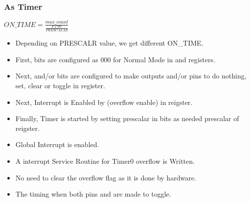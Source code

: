 \subsubsection{As Timer}
\begin{center}
    $ON\_TIME = \frac{max\_count}{\frac{F\_CPU}{PRESCALAR}}$
\end{center}
\begin{itemize}
    \item Depending on PRESCALR value, we get different ON\_TIME.
    \item First,  bits are configured as 000 for Normal Mode in  and  registers.
    \item Next,  and/or  bits are configured to make outputs  and/or  pins to do nothing, set, clear or toggle in  register.
    \item Next, Interrupt is Enabled by  (overflow enable) in  reigster.
    \item Finally, Timer is started by setting prescalar in  bits as needed prescalar of  reigster.
    \item Global Interrupt is enabled.
    \item A interrupt Service Routine for Timer0 overflow is Written.
    \item No need to clear the overflow flag as it is done by hardware.
    \item The timing when both pins  and  are made to toggle.
\end{itemize}

